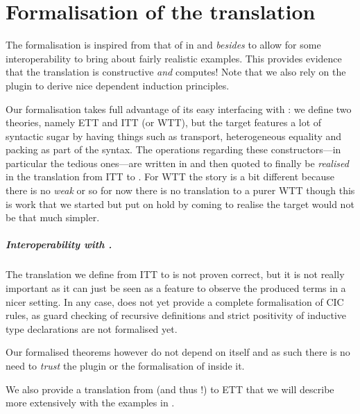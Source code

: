 \chapter{Formalisation of the translation}

The formalisation is inspired from that of \Coq in \MetaCoq and \emph{besides}
\MetaCoq to allow for some interoperability to bring about fairly realistic
examples. This provides evidence that the translation is constructive \emph{and}
computes!
Note that we also rely on the
\Equations~ plugin to
derive nice dependent induction principles.

Our formalisation takes full advantage of its easy interfacing with \MetaCoq:
we define two theories, namely \acrshort{ETT} and \acrshort{ITT}
(or \acrshort{WTT}), but the target features a lot of syntactic
sugar by having things such as transport, heterogeneous equality and packing as
part of the syntax. The operations regarding these constructors---in particular
the tedious ones---are written in \Coq and then quoted to finally be
\emph{realised} in the translation from \acrshort{ITT} to \MetaCoq.
For \acrshort{WTT} the story is a bit different because there is no \emph{weak}
\Coq or \MetaCoq so for now there is no translation to a purer \acrshort{WTT}
though this is work that we started but put on hold by coming to realise the
target would not be that much simpler.

\paragraph{Interoperability with \MetaCoq.}
The translation we define from \acrshort{ITT} to \MetaCoq is not proven
correct, but it is not really important as it can just be seen as a
feature to observe the produced terms in a nicer setting.
In any case, \MetaCoq does not yet provide a complete formalisation of
\acrshort{CIC} rules, as guard checking of recursive definitions and strict
positivity of inductive type declarations are not formalised yet.

Our formalised theorems however do not depend on \MetaCoq itself and as such
there is no need to \emph{trust} the plugin or the formalisation of \Coq inside
it.

We also provide a translation from \MetaCoq (and thus \Coq!) to \acrshort{ETT}
that we will describe more extensively with the examples in
.

